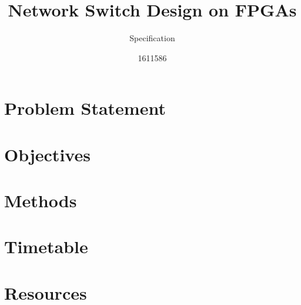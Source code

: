 \documentclass[12pt, a4paper, twoside]{IEEEtran}
\title{Network Switch Design on FPGAs}
\subtitle{Specification}
\author{1611586}
\begin{document}
\maketitle


\section{Problem Statement}
\section{Objectives}
\section{Methods}
\section{Timetable}
\section{Resources}




\end{document}
